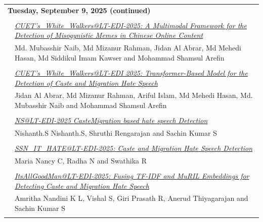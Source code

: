 \documentclass[11pt,oneside]{book}
\begin{document}
    
    \begin{tabular}{p{24mm}p{124mm}}
    \multicolumn{2}{l}{\bf Tuesday, September 9, 2025 (continued)} \\\\
          
                      & \hyperlink{page.68}{\emph{CUET's\_White\_Walkers@LT-EDI-2025: A Multimodal Framework for the Detection of Misogynistic Memes in Chinese Online Content}}\\
        & Md. Mubasshir Naib\index{Naib}, Md Mizanur Rahman\index{Rahman}, Jidan Al Abrar\index{Abrar}, Md Mehedi Hasan\index{Hasan}, Md Siddikul Imam Kawser\index{Kawser} and Mohammad Shamsul Arefin\index{Arefin}\\\\
                
                      & \hyperlink{page.75}{\emph{CUET's\_White\_Walkers@LT-EDI 2025: Transformer-Based Model for the Detection of Caste and Migration Hate Speech}}\\
        & Jidan Al Abrar\index{Abrar}, Md Mizanur Rahman\index{Rahman}, Ariful Islam\index{Islam}, Md Mehedi Hasan\index{Hasan}, Md. Mubasshir Naib\index{Naib} and Mohammad Shamsul Arefin\index{Arefin}\\\\
                
                      & \hyperlink{page.80}{\emph{NS@LT-EDI-2025 CasteMigration based hate speech Detection}}\\
        & Nishanth.S Nishanth.S\index{Nishanth.S}, Shruthi Rengarajan\index{Rengarajan} and Sachin Kumar S\index{S}\\\\
                
                      & \hyperlink{page.84}{\emph{SSN\_IT\_HATE@LT-EDI-2025: Caste and Migration Hate Speech Detection}}\\
        & Maria Nancy C\index{C}, Radha N\index{N} and Swathika R\index{R}\\\\
                
                      & \hyperlink{page.90}{\emph{ItsAllGoodMan@LT-EDI-2025: Fusing TF-IDF and MuRIL Embeddings for Detecting Caste and Migration Hate Speech}}\\
        & Amritha Nandini K L\index{L}, Vishal S\index{S}, Giri Prasath R\index{R}, Anerud Thiyagarajan\index{Thiyagarajan} and Sachin Kumar S\index{S}\\\\
                

\end{tabular}
\end{document}
